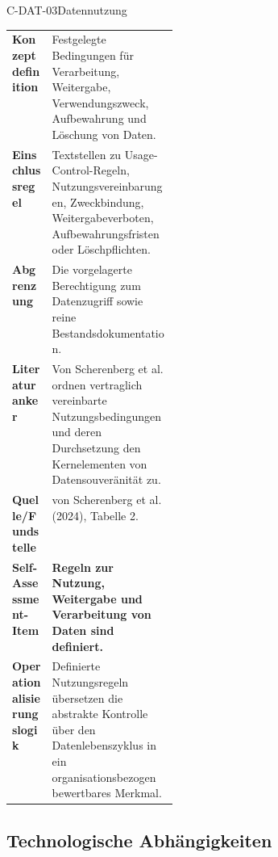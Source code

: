 \documentclass[10pt,a4paper]{article}
\begin{document}
\begin{codecard}{C-DAT-03}{Datennutzung}
\begin{tabularx}{\linewidth}{@{}>{\RaggedRight\arraybackslash\bfseries\color{DeepNavy}}p{0.245\linewidth}>{\RaggedRight\arraybackslash}X@{}}
Konzeptdefinition & Festgelegte Bedingungen für Verarbeitung, Weitergabe, Verwendungszweck, Aufbewahrung und Löschung von Daten. \\
\arrayrulecolor{SoftRule}\hline
Einschlussregel & Textstellen zu Usage-Control-Regeln, Nutzungsvereinbarungen, Zweckbindung, Weitergabeverboten, Aufbewahrungsfristen oder Löschpflichten. \\
\arrayrulecolor{SoftRule}\hline
Abgrenzung & Die vorgelagerte Berechtigung zum Datenzugriff sowie reine Bestandsdokumentation. \\
\arrayrulecolor{SoftRule}\hline
Literaturanker & Von Scherenberg et al. ordnen vertraglich vereinbarte Nutzungsbedingungen und deren Durchsetzung den Kernelementen von Datensouveränität zu. \\
\arrayrulecolor{SoftRule}\hline
Quelle/Fundstelle & von Scherenberg et al. (2024), Tabelle 2. \\
\arrayrulecolor{SoftRule}\hline
Self-Assessment-Item & \textbf{Regeln zur Nutzung, Weitergabe und Verarbeitung von Daten sind definiert.} \\
\arrayrulecolor{SoftRule}\hline
Operationalisierungslogik & Definierte Nutzungsregeln übersetzen die abstrakte Kontrolle über den Datenlebenszyklus in ein organisationsbezogen bewertbares Merkmal. \\
\end{tabularx}
\end{codecard}

\subsection{Technologische Abhängigkeiten}
\label{supp:dimension-3}
\end{document}

